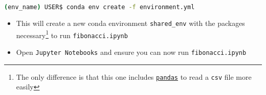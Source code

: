 \documentclass[10pt]{article}
\begin{document}
\begin{lstlisting}[language=bash]
	(env_name) USER$ conda env create -f environment.yml 
\end{lstlisting}

\begin{itemize}
	\item This will create a new conda environment \lstinline|shared_env| with the packages necessary\footnote{The only difference is that this one includes \href{https://pandas.pydata.org/}{\lstinline|pandas|} to read a \lstinline|csv| file more easily} to run \lstinline|fibonacci.ipynb|
	\item Open \lstinline|Jupyter Notebooks| and ensure you can now run \lstinline|fibonacci.ipynb|
\end{itemize}
	
\end{document}
